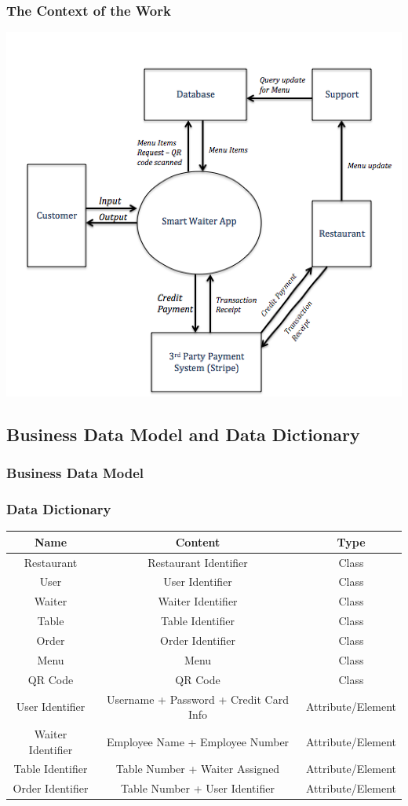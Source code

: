 \documentclass[12pt, titlepage]{article}
\begin{document}
\subsubsection{The Context of the Work} 
\includegraphics{Context.png}
\subsection{Business Data Model and Data Dictionary}
\subsubsection{Business Data Model}
\subsubsection{Data Dictionary}
\begin{center}
\begin{tabular}{ |c|c|c| }
\hline
Name & Content & Type \\
\hline
Restaurant & Restaurant Identifier & Class \\
User & User Identifier & Class \\
Waiter & Waiter Identifier & Class \\
Table & Table Identifier & Class \\
Order & Order Identifier & Class \\
Menu & Menu & Class \\
QR Code & QR Code & Class \\
User Identifier & Username + Password + Credit Card Info & Attribute/Element \\
Waiter Identifier & Employee Name + Employee Number & Attribute/Element \\
Table Identifier & Table Number + Waiter Assigned & Attribute/Element \\
Order Identifier & Table Number + User Identifier & Attribute/Element \\



\hline
\end{tabular}
\end{center}
\end{document}

